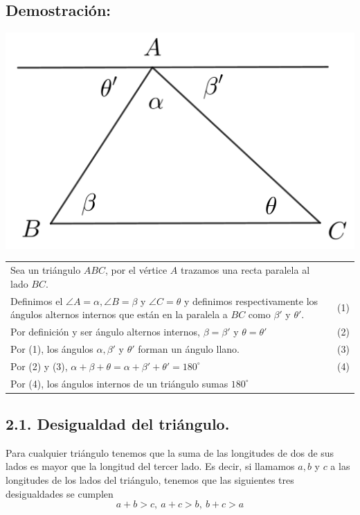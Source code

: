 \documentclass[12pt,a4paper]{article}
\begin{document}
\subsection*{Demostración:}
\begin{center}
\includegraphics[scale=0.7]{Imagenes/demo1.png}
\end{center}
\begin{tabular}{p{15.9cm} p{1cm}}
Sea un triángulo $ABC$, por el vértice $A$ trazamos una recta paralela al lado $BC$. 
\\Definimos el $\angle A=\alpha, \angle B=\beta$ y $\angle C= \theta$ y definimos respectivamente los  ángulos alternos internos que están en la paralela a $BC$ como $\beta '$ y $\theta '$. & \medskip (1)
\\Por definición y ser ángulo alternos internos, $\beta= \beta '$ y $\theta=\theta '$ &(2)
\\Por (1), los ángulos $\alpha,\beta'$ y $\theta'$ forman un ángulo llano. & (3)
\\Por (2) y (3), $\alpha + \beta+ \theta = \alpha + \beta '+ \theta ' = 180^ \circ$ &(4)
\\Por (4), los  ángulos internos de un triángulo sumas $180^\circ$
\end{tabular}
\subsection*{2.1. Desigualdad del triángulo.}
Para cualquier triángulo tenemos que la suma de las longitudes de dos de sus lados es mayor que la longitud del tercer lado. Es decir, si llamamos $a, b$ y $c$ a las longitudes de los lados del triángulo, tenemos que las siguientes tres desigualdades se cumplen
$$a+b>c, \> a+c>b, \> b+c>a$$
\end{document}
